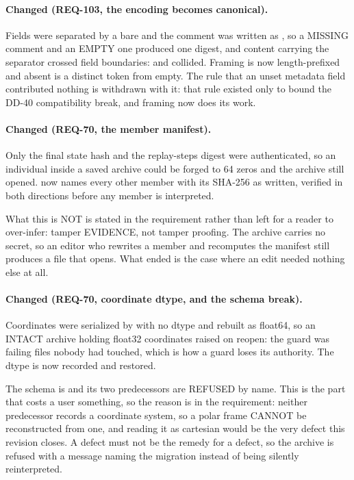 \paragraph{Changed (REQ-103, the encoding becomes canonical).} Fields
were separated by a bare  and the comment was written as
, so a MISSING comment and an EMPTY one produced
one digest, and content carrying the separator crossed field
boundaries:  and
 collided. Framing is now
length-prefixed and absent is a distinct token from empty. The rule
that an unset metadata field contributed nothing is withdrawn with it:
that rule existed only to bound the DD-40 compatibility break, and
framing now does its work.

\paragraph{Changed (REQ-70, the member manifest).} Only the final state
hash and the replay-steps digest were authenticated, so an individual
 inside a saved archive could be forged
to 64 zeros and the archive still opened.  now
names every other member with its SHA-256 as written, verified in both
directions before any member is interpreted.

What this is NOT is stated in the requirement rather than left for a
reader to over-infer: tamper EVIDENCE, not tamper proofing. The archive
carries no secret, so an editor who rewrites a member and recomputes the
manifest still produces a file that opens. What ended is the case where
an edit needed nothing else at all.

\paragraph{Changed (REQ-70, coordinate dtype, and the schema break).}
Coordinates were serialized by  with no dtype and rebuilt
as float64, so an INTACT archive holding float32 coordinates raised
 on reopen: the guard was failing files nobody
had touched, which is how a guard loses its authority. The dtype is now
recorded and restored.

The schema is  and its two predecessors are REFUSED
by name. This is the part that costs a user something, so the reason is
in the requirement: neither predecessor records a coordinate system, so
a polar frame CANNOT be reconstructed from one, and reading it as
cartesian would be the very defect this revision closes. A defect must
not be the remedy for a defect, so the archive is refused with a
message naming the migration instead of being silently reinterpreted.

